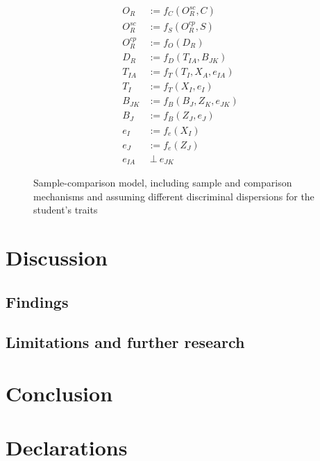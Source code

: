 \documentclass[
  authoryear,
  review,
  1p]{elsarticle}
\begin{document}
\begin{figure}[H]
\begin{minipage}{0.50\linewidth}
{\[
\begin{aligned}
  O_{R} & := f_{C}(O^{sc}_{R}, C) \\
  O^{sc}_{R} & := f_{S}(O^{cp}_{R}, S) \\
  O^{cp}_{R} & := f_{O}(D_{R}) \\
  D_{R} & := f_{D}(T_{IA}, B_{JK}) \\
  T_{IA} & := f_{T}(T_{I}, X_{A}, e_{IA}) \\
  T_{I} & := f_{T}(X_{I}, e_{I}) \\
  B_{JK} & := f_{B}(B_{J}, Z_{K}, e_{JK}) \\
  B_{J} & := f_{B}(Z_{J}, e_{J}) \\
  e_{I} & := f_{e}(X_{I}) \\
  e_{J} & := f_{e}(Z_{J}) \\
  e_{IA} & \:\bot\:e_{JK}
\end{aligned}
\]

}


\end{minipage}%

\caption{\label{fig-cj16}Sample-comparison model, including sample and
comparison mechanisms and assuming different discriminal dispersions for
the student's traits}

\end{figure}%

\section{Discussion}\label{sec-discussion}

\subsection{Findings}\label{sec-discussion-finding}

\subsection{Limitations and further
research}\label{sec-discussion-limitations}

\section{Conclusion}\label{sec-conclusion}

\newpage{}

\section*{Declarations}\label{declarations}
\end{document}
